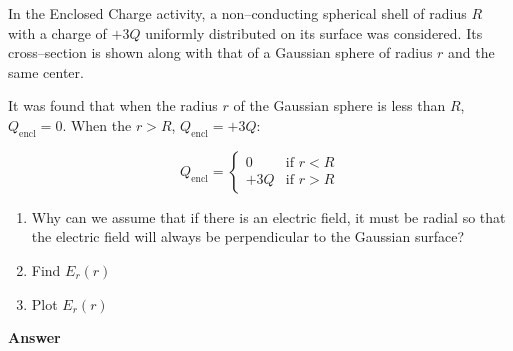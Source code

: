 \documentclass{article}
\begin{document}
In the Enclosed Charge activity, a non--conducting spherical shell of radius $R$ with a charge of $+3Q$ uniformly distributed on its surface was considered. Its cross--section is shown along with that of a Gaussian sphere of radius $r$ and the same center.

It was found that when the radius $r$ of the Gaussian sphere is less than $R$, $Q_{\text{encl}}=0$. When the $r>R$, $Q_{\text{encl}}=+3Q$:

$$
   Q_{\text{encl}} = \begin{cases}
     0   &\text{if } r < R \\
     +3Q &\text{if } r > R
   \end{cases}
   $$



\begin{enumerate}

  \item Why can we assume that if there is an electric field, it must be radial so that the electric field will always be perpendicular to the Gaussian surface?

  \item Find $E_r(r)$

  \item Plot $E_r(r)$

\end{enumerate}

\newpage

\textbf{Answer}


\end{document}
